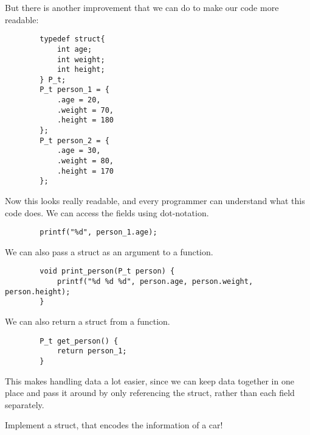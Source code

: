 \documentclass{dcbl/challenge}
\begin{document}
\begin{aufgabe}
    But there is another improvement that we can do to make our code more readable:
    \begin{lstlisting}
        typedef struct{
            int age;
            int weight;
            int height;
        } P_t;
        P_t person_1 = {
            .age = 20,
            .weight = 70,
            .height = 180
        };
        P_t person_2 = {
            .age = 30,
            .weight = 80,
            .height = 170
        };
    \end{lstlisting}
    Now this looks really readable, and every programmer can understand what this code does. 
    We can access the fields using dot-notation.
    \begin{lstlisting}
        printf("%d", person_1.age); 
    \end{lstlisting}
    We can also pass a struct as an argument to a function.
    \begin{lstlisting}
        void print_person(P_t person) {
            printf("%d %d %d", person.age, person.weight, person.height);
        }
    \end{lstlisting}
    We can also return a struct from a function.
    \begin{lstlisting}
        P_t get_person() {
            return person_1;
        }
    \end{lstlisting}
    This makes handling data a lot easier, since we can keep data together in one place and pass it around by only referencing the struct, rather than each field separately.
    
    Implement a struct, that encodes the information of a car!    
\end{aufgabe}
\end{document}
